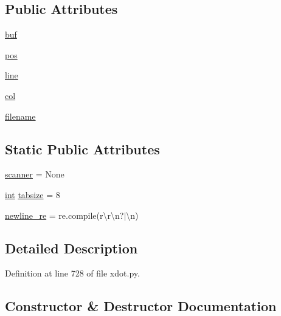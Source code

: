 \subsection*{Public Attributes}
\begin{DoxyCompactItemize}
\item 
\hyperlink{classsmacc__viewer_1_1xdot_1_1xdot_1_1Lexer_ae6f555ad406cdd55d65f8d35d5f26825}{buf}
\item 
\hyperlink{classsmacc__viewer_1_1xdot_1_1xdot_1_1Lexer_a5748d2ef8e2cd8390bec0bd89621c2d6}{pos}
\item 
\hyperlink{classsmacc__viewer_1_1xdot_1_1xdot_1_1Lexer_a0176a7344cbcc6622d7153fa8141440c}{line}
\item 
\hyperlink{classsmacc__viewer_1_1xdot_1_1xdot_1_1Lexer_a1f662e52d39cd1cdddb5cfc02e549018}{col}
\item 
\hyperlink{classsmacc__viewer_1_1xdot_1_1xdot_1_1Lexer_aeec6d9f9d2545d6a4bc01b386b81ac12}{filename}
\end{DoxyCompactItemize}
\subsection*{Static Public Attributes}
\begin{DoxyCompactItemize}
\item 
\hyperlink{classsmacc__viewer_1_1xdot_1_1xdot_1_1Lexer_a0d2ace7acb07ed25a224fbdea1cfba89}{scanner} = None
\item 
\hyperlink{classint}{int} \hyperlink{classsmacc__viewer_1_1xdot_1_1xdot_1_1Lexer_a54e3985e9e746bf106819b7a3b340646}{tabsize} = 8
\item 
\hyperlink{classsmacc__viewer_1_1xdot_1_1xdot_1_1Lexer_af90a8038b30408f3e9cc7abc26235907}{newline\+\_\+re} = re.\+compile(r\textquotesingle{}\textbackslash{}r\textbackslash{}n?$\vert$\textbackslash{}n\textquotesingle{})
\end{DoxyCompactItemize}


\subsection{Detailed Description}


Definition at line 728 of file xdot.\+py.



\subsection{Constructor \& Destructor Documentation}
